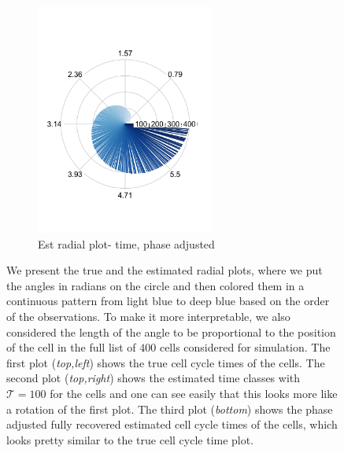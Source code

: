 \documentclass[11pt]{article}
\begin{document}
\begin{figure}[ht]
     \begin{subfigure}[t]{0.5\textwidth}
        \centering
        \includegraphics[height=3in]{../figures/cell_order_R_figs/estd_cell_order_phase_adjusted.png}
        \caption{Est radial plot- time, phase adjusted}
    \end{subfigure}
    \caption{We present the true and the estimated radial plots, where we put the angles in radians on the circle and then colored them in a continuous pattern from light blue  to deep blue based on the order of the observations. To make it more interpretable, we also considered the length of the angle to be proportional to the position of the cell in the full list of $400$ cells considered for simulation. The first plot (\textit{top,left}) shows the true cell cycle times of the cells. The second plot (\textit{top,right}) shows the estimated time classes with $\mathcal{T}=100$ for the cells and one can see easily that this looks more like a rotation of the first plot. The third plot (\textit{bottom}) shows the phase adjusted fully recovered estimated cell cycle times of the cells, which looks pretty similar to the true cell cycle time plot.}
 \label{fig:fig2}
 \end{figure}
\end{document}
